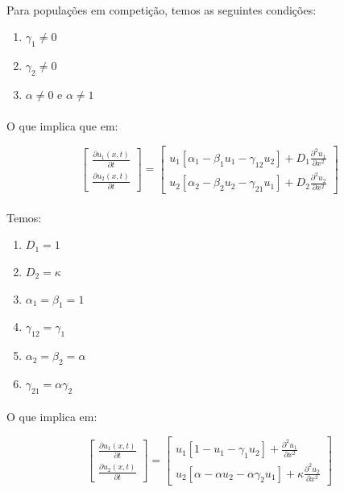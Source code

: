\documentclass{article}
\begin{document}
	\paragraph{}	
	Para populações em competição, temos as seguintes condições:
	
	\begin{enumerate}
		\item $\gamma_1 \ne 0$
		\item $\gamma_2 \ne 0$
		\item $\alpha \ne 0$ e $\alpha \ne 1$
	\end{enumerate}

	\paragraph{}
	O que implica que em:
	
	$$\left[ \begin{array}{c}
		\frac{\partial u_1(x,t)}{\partial t} \\
		\frac{\partial u_2(x,t)}{\partial t} \end{array} \right]
	=
	\left[ \begin{array}{cc}
		u_1 \left[\alpha_1 - \beta_1 u_1  - \gamma_{12} u_2 \right] + D_1 \frac{\partial^2 u_1}{\partial x^2} \\
		u_2 \left[\alpha_2 - \beta_2 u_2  - \gamma_{21} u_1 \right] + D_2 \frac{\partial^2 u_2}{\partial x^2} \end{array} \right]$$
	
	\paragraph{}
	Temos:
	
	\begin{enumerate}
		\item $D_1 = 1$
		\item $D_2 = \kappa$
		\item $\alpha_1 = \beta_1 = 1$
		\item $\gamma_{12} = \gamma_1$
		\item $\alpha_2 = \beta_2 = \alpha$
		\item $\gamma_{21} = \alpha \gamma_2$
	\end{enumerate}
	
	\paragraph{}
	O que implica em:
	
	$$\left[ \begin{array}{c}
		\frac{\partial u_1(x,t)}{\partial t} \\
		\frac{\partial u_2(x,t)}{\partial t} \end{array} \right]
	=
	\left[ \begin{array}{cc}
		u_1 \left[1 - u_1  - \gamma_1 u_2 \right] +  \frac{\partial^2 u_1}{\partial x^2} \\
		u_2 \left[\alpha - \alpha u_2  - \alpha \gamma_2 u_1 \right] + \kappa \frac{\partial^2 u_2}{\partial x^2} \end{array} \right]$$
	
\end{document}
